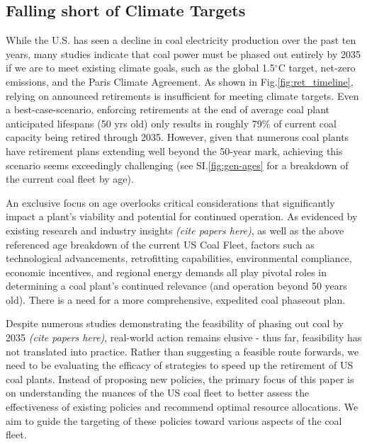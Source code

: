 \subsection{Falling short of Climate Targets}
While the U.S. has seen a decline in coal electricity production over the past ten years, many studies indicate that coal power must be phased out entirely by 2035 if we are to meet existing climate goals, such as the global 1.5$^\circ$C target,
net-zero emissions, 
and the Paris Climate Agreement. As shown in Fig.\ref{fig:ret_timeline}, relying on announced retirements is insufficient for meeting climate targets.
Even a best-case-scenario, enforcing retirements at the end of average coal plant anticipated lifespans (50 yrs old) only results in roughly 79\% of current coal capacity being retired through 2035. 
However, given that numerous coal plants have retirement plans extending well beyond the 50-year mark, achieving this scenario seems exceedingly challenging (see SI.\ref{fig:gen-ages} for a breakdown of the current coal fleet by age). 

An exclusive focus on age overlooks critical considerations that significantly impact a plant's viability and potential for continued operation. 
As evidenced by existing research and industry insights \textit{(cite papers here)}, as well as the above referenced age breakdown of the current US Coal Fleet,
factors such as technological advancements, retrofitting capabilities, environmental compliance, economic incentives, and regional energy demands all play pivotal roles in determining a coal plant's continued relevance (and operation beyond 50 years old).
There is a need for a more comprehensive, expedited coal phaseout plan. 

Despite numerous studies demonstrating the feasibility of phasing out coal by 2035 \textit{(cite papers here)}, 
real-world action remains elusive - thus far, feasibility has not translated into practice. 
Rather than suggesting a feasible route forwards, we need to be evaluating the efficacy of strategies to speed up the retirement of US coal plants. 
Instead of proposing new policies, the primary focus of this paper is on understanding the nuances of the US coal fleet to better assess the effectiveness 
of existing policies and recommend optimal resource allocations. We aim to guide the targeting of these policies toward various aspects of the coal fleet.


